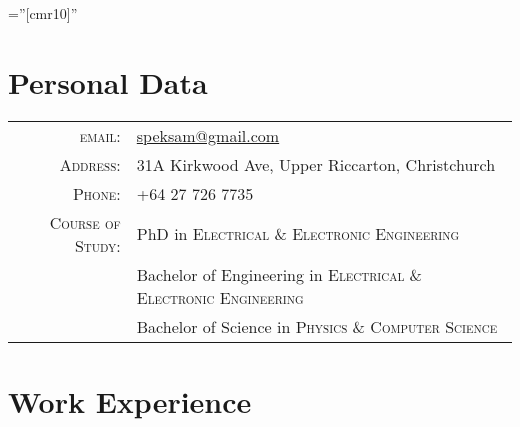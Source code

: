 \documentclass[a4paper,10pt]{article} %
\begin{document}
\pagestyle{empty} %

\font\fb=''[cmr10]'' %


\par{\smallskip\par} %

\section{Personal Data}

\begin{tabular}{rl}
\textsc{email:} & \href{mailto:speksam@gmail.com}{speksam@gmail.com} \\
\textsc{Address:} & 31A Kirkwood Ave, Upper Riccarton, Christchurch \\
\textsc{Phone:} & +64 27 726 7735 \\
\textsc{Course of Study:} & PhD in \textsc{Electrical \& Electronic Engineering} \\
& Bachelor of Engineering in \textsc{Electrical \& Electronic Engineering} \\
& Bachelor of Science in \textsc{Physics \& Computer Science} 

\end{tabular}


\section{Work Experience}
\end{document}
